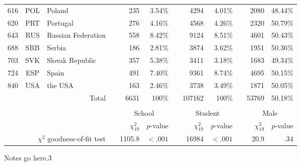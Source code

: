 {\begin{tabular}{ccl c rr c rr c rr}
      616   & POL   & Poland &       & 235   & 3.54\% &       & 4294  & 4.01\% &       & 2080  & 48.44\% \\
      620   & PRT   & Portugal &       & 276   & 4.16\% &       & 4568  & 4.26\% &       & 2320  & 50.79\% \\
      643   & RUS   & Russian Federation &       & 558   & 8.42\% &       & 9124  & 8.51\% &       & 4601  & 50.43\% \\
      688   & SRB   & Serbia &       & 186   & 2.81\% &       & 3874  & 3.62\% &       & 1951  & 50.36\% \\
      703   & SVK   & Slovak Republic &       & 357   & 5.38\% &       & 3411  & 3.18\% &       & 1683  & 49.34\% \\
      724   & ESP   & Spain &       & 491   & 7.40\% &       & 9361  & 8.74\% &       & 4695  & 50.15\% \\
      840   & USA   & the USA &       & 163   & 2.46\% &       & 3738  & 3.49\% &       & 1871  & 50.05\% \\
      \midrule
            &       & \multicolumn{1}{r}{Total} &       & 6631  & 100\% &       & 107162 & 100\% &       & 53769 & 50.18\% \\
      &&&&&&&&&&&\\
      &&&& \multicolumn{2}{c}{School} &       & \multicolumn{2}{c}{Student} &       & \multicolumn{2}{c}{Male} \\
      \cmidrule{5-6}\cmidrule{8-9}\cmidrule{11-12}
      &&&& $\chi^2_{19}$ & $p$-value && $\chi^2_{19}$ & $p$-value && $\chi^2_{19}$ & $p$-value\\
      \midrule
      \multicolumn{3}{r}{$\chi^2$ goodness-of-fit test} && 1105.8 & $<.001$ && 16984 & $<.001$ && 20.9 & $.34$\\
      \bottomrule
      \end{tabular}
}{Notes go here.}{3}
